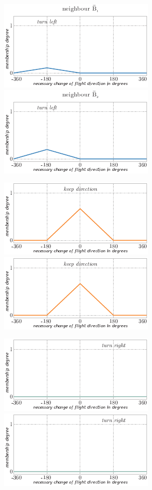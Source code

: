 \begin{figure}%
\null\vspace*{2mm}
\includegraphics{fig[attractionFLScombined]a}\hspace*{2mm}\includegraphics{fig[attractionFLScombined]b}
\par\vspace*{2mm}
\includegraphics{fig[attractionFLScombined]c}\hspace*{2mm}\includegraphics{fig[attractionFLScombined]d}
\par\vspace*{2mm}
\includegraphics{fig[attractionFLScombined]e}\hspace*{2mm}\includegraphics{fig[attractionFLScombined]f}

\end{figure}
